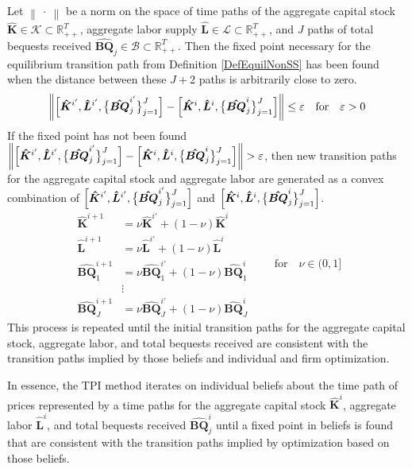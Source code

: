 \documentclass[letterpaper,12pt]{article}
\theoremstyle{definition}
\newcommand\ve{\varepsilon}
\newcommand\norm[1]{\left\lVert#1\right\rVert}
\begin{document}
  Let $\norm{\:\cdot\:}$ be a norm on the space of time paths of the aggregate capital stock $\bm{\hat{K}}\in\mathcal{K}\subset\mathbb{R}_{++}^T$, aggregate labor supply $\bm{\hat{L}}\in\mathcal{L}\subset\mathbb{R}_{++}^T$, and $J$ paths of total bequests received $\bm{\hat{BQ}}_j\in\mathcal{B}\subset\mathbb{R}_{++}^T$. Then the fixed point necessary for the equilibrium transition path from Definition \ref{DefEquilNonSS} has been found when the distance between these $J+2$ paths is arbitrarily close to zero.
  \begin{equation}\label{EqTPIconverge}
    \norm{\Bigl[\bm{\hat{K}}^{i'}, \bm{\hat{L}}^{i'},\bigl\{\bm{\hat{BQ}}_j^{i'}\bigr\}_{j=1}^J\Bigr] - \Bigl[\bm{\hat{K}}^{i},\bm{\hat{L}}^{i},\bigl\{\bm{\hat{BQ}}_j^{i}\bigr\}_{j=1}^J\Bigr]} \leq \ve \quad\text{for}\quad \ve>0
  \end{equation}
  If the fixed point has not been found $\norm{\Bigl[\bm{\hat{K}}^{i'}, \bm{\hat{L}}^{i'},\bigl\{\bm{\hat{BQ}}_j^{i'}\bigr\}_{j=1}^J\Bigr] - \Bigl[\bm{\hat{K}}^{i},\bm{\hat{L}}^{i},\bigl\{\bm{\hat{BQ}}_j^{i}\bigr\}_{j=1}^J\Bigr]} > \ve$, then new transition paths for the aggregate capital stock and aggregate labor are generated as a convex combination of $\Bigl[\bm{\hat{K}}^{i'},\bm{\hat{L}}^{i'},\bigl\{\bm{\hat{BQ}}_j^{i'}\bigr\}_{j=1}^J\Bigr]$ and $\Bigl[\bm{\hat{K}}^{i},\bm{\hat{L}}^{i},\bigl\{\bm{\hat{BQ}}_j^{i}\bigr\}_{j=1}^J\Bigr]$.
  \begin{equation}\label{EqTPInewpath}
    \begin{split}
      \bm{\hat{K}}^{i+1} &= \nu\bm{\hat{K}}^{i'} + (1-\nu)\bm{\hat{K}}^{i} \\
      \bm{\hat{L}}^{i+1} &= \nu\bm{\hat{L}}^{i'} + (1-\nu)\bm{\hat{L}}^{i} \\
      \bm{\hat{BQ}}_1^{i+1} &= \nu\bm{\hat{BQ}}_1^{i'} + (1-\nu)\bm{\hat{BQ}}_1^{i} \\
      &\vdots \\
      \bm{\hat{BQ}}_J^{i+1} &= \nu\bm{\hat{BQ}}_J^{i'} + (1-\nu)\bm{\hat{BQ}}_J^{i}
    \end{split} \quad\quad\text{for}\quad \nu\in(0,1]
  \end{equation}
  This process is repeated until the initial transition paths for the aggregate capital stock, aggregate labor, and total bequests received are consistent with the transition paths implied by those beliefs and individual and firm optimization.

  In essence, the TPI method iterates on individual beliefs about the time path of prices represented by a time paths for the aggregate capital stock $\bm{\hat{K}}^i$, aggregate labor $\bm{\hat{L}}^i$, and total bequests received $\bm{\hat{BQ}}_j^i$ until a fixed point in beliefs is found that are consistent with the transition paths implied by optimization based on those beliefs.
\end{document}
